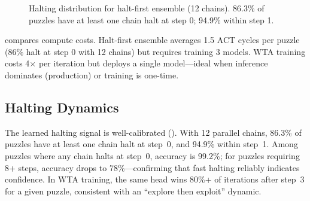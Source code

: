 \begin{figure}[htb]
\centering
{}
\caption{Halting distribution for halt-first ensemble (12 chains). 86.3\% of
puzzles have at least one chain halt at step 0; 94.9\% within step 1.}
\label{fig:halt-dist}
\end{figure}

 compares compute costs. Halt-first ensemble averages 1.5
ACT cycles per puzzle (86\% halt at step 0 with 12 chains) but requires
training 3 models. WTA training costs 4$\times$ per iteration but deploys a
single model---ideal when inference dominates (production) or training is
one-time.


\subsection{Halting Dynamics}
\label{sec:halting}

The learned halting signal is well-calibrated (). With 12
parallel chains, 86.3\% of puzzles have at least one chain halt at step~0, and
94.9\% within step~1. Among puzzles where any chain halts at step~0, accuracy
is 99.2\%; for puzzles requiring 8+ steps, accuracy drops to 78\%---confirming
that fast halting reliably indicates confidence. In WTA training, the same head
wins 80\%+ of iterations after step~3 for a given puzzle, consistent with an
``explore then exploit'' dynamic.


